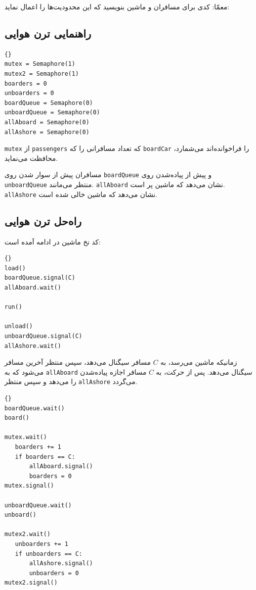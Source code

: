\documentclass{book}
\newcommand{\clearemptydoublepage}{\newpage\cleardoublepage}
\begin{document}
    معمّا: کدی برای مسافران و ماشین بنویسید که این محدودیت‌ها را اعمال نماید:


\clearemptydoublepage
\subsection{راهنمایی ترن هوایی}

\begin{latin}
\begin{lstlisting}[title=\rl{راهنمایی ترن هوایی}]{}
mutex = Semaphore(1)
mutex2 = Semaphore(1)
boarders = 0
unboarders = 0
boardQueue = Semaphore(0)
unboardQueue = Semaphore(0)
allAboard = Semaphore(0)
allAshore = Semaphore(0)
\end{lstlisting}
\end{latin}

    {\tt mutex} از {\tt passengers} که
    تعداد  مسافرانی را که {\tt boardCar} را فراخوانده‌اند می‌شمارد، محافظت می‌نماید. 
    
    مسافران پیش از سوار شدن  روی {\tt boardQueue}   و پیش از پیاده‌شدن روی {\tt unboardQueue} منتظر می‌مانند.   {\tt allAboard}
    نشان می‌دهد که ماشین پر است. {\tt allAshore} نشان می‌دهد که ماشین خالی شده است. 


\clearemptydoublepage
\subsection{راه‌حل ترن هوایی}

    کد نخ ماشین در ادامه آمده است: 

\begin{latin}
\begin{lstlisting}[title=\rl{راه‌حل ترن هوایی (ماشین)}]{} 
load()
boardQueue.signal(C)
allAboard.wait()

run()

unload()
unboardQueue.signal(C)
allAshore.wait()
\end{lstlisting}
\end{latin}

    زمانیکه ماشین می‌رسد، به $C$  مسافر سیگنال می‌دهد، سپس منتظر آخرین مسافر می‌شود که به {\tt allAboard} سیگنال می‌دهد. 
    پس از حرکت، به $C$ مسافر اجازه پیاده‌شدن را می‌دهد و سپس منتظر {\tt allAshore} می‌گردد. 
\begin{latin}
\begin{lstlisting}[title=\rl{راه‌حل ترن هوایی (مسافر)}]{} 
boardQueue.wait()
board()

mutex.wait()
   boarders += 1
   if boarders == C:
       allAboard.signal()
       boarders = 0
mutex.signal()

unboardQueue.wait()
unboard()

mutex2.wait()
   unboarders += 1
   if unboarders == C:
       allAshore.signal()
       unboarders = 0
mutex2.signal()
\end{lstlisting}
\end{latin}
\end{document}
